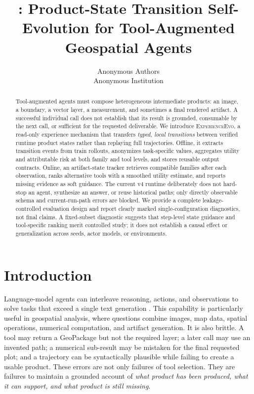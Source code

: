 \documentclass[10pt]{article}
\title{\method: Product-State Transition Self-Evolution for Tool-Augmented Geospatial Agents}
\author{Anonymous Authors\\Anonymous Institution}
\date{}
\newcommand{\method}{\textsc{ExperienceEvo}}
\begin{document}
\maketitle

\begin{abstract}
Tool-augmented agents must compose heterogeneous intermediate products: an image, a boundary, a vector layer, a measurement, and sometimes a final rendered artifact. A successful individual call does not establish that its result is grounded, consumable by the next call, or sufficient for the requested deliverable. We introduce \method{}, a read-only experience mechanism that transfers \emph{typed, local transitions} between verified runtime product states rather than replaying full trajectories. Offline, it extracts transition events from train rollouts, anonymizes task-specific values, aggregates utility and attributable risk at both family and tool levels, and stores reusable output contracts. Online, an artifact-state tracker retrieves compatible families after each observation, ranks alternative tools with a smoothed utility estimate, and reports missing evidence as soft guidance. The current v4 runtime deliberately does not hard-stop an agent, synthesize an answer, or reuse historical paths; only directly observable schema and current-run-path errors are blocked. We provide a complete leakage-controlled evaluation design and report clearly marked single-configuration diagnostics, not final claims. A fixed-subset diagnostic suggests that step-level state guidance and tool-specific ranking merit controlled study; it does not establish a causal effect or generalization across seeds, actor models, or environments.
\end{abstract}

\section{Introduction}
Language-model agents can interleave reasoning, actions, and observations to solve tasks that exceed a single text generation \cite{react}. This capability is particularly useful in geospatial analysis, where questions combine images, map data, spatial operations, numerical computation, and artifact generation. It is also brittle. A tool may return a GeoPackage but not the required layer; a later call may use an invented path; a numerical sub-result may be mistaken for the final requested plot; and a trajectory can be syntactically plausible while failing to create a usable product. These errors are not only failures of tool selection. They are failures to maintain a grounded account of \emph{what product has been produced, what it can support, and what product is still missing}.
\end{document}
